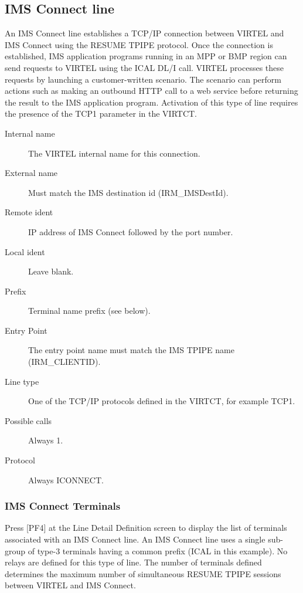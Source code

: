 \documentclass[letterpaper,10pt,english]{sphinxmanual}
\begin{document}
\subsection{IMS Connect line}
\label{\detokenize{connectivity_guide:ims-connect-line}}
An IMS Connect line establishes a TCP/IP connection between VIRTEL and IMS Connect using the RESUME TPIPE protocol. Once the connection is established, IMS application programs running in an MPP or BMP region can send requests to VIRTEL using the ICAL DL/I call. VIRTEL processes these requests by launching a customer-written scenario. The scenario can perform actions such as making an outbound HTTP call to a web service before returning the result to the IMS application program. Activation of this type of line requires the presence of the TCP1 parameter in the VIRTCT.


\begin{description}
\item[{Internal name}] \leavevmode
The VIRTEL internal name for this connection.

\item[{External name}] \leavevmode
Must match the IMS destination id (IRM\_IMSDestId).

\item[{Remote ident}] \leavevmode
IP address of IMS Connect followed by the port number.

\item[{Local ident}] \leavevmode
Leave blank.

\item[{Prefix}] \leavevmode
Terminal name prefix (see below).

\item[{Entry Point}] \leavevmode
The entry point name must match the IMS TPIPE name (IRM\_CLIENTID).

\item[{Line type}] \leavevmode
One of the TCP/IP protocols defined in the VIRTCT, for example TCP1.

\item[{Possible calls}] \leavevmode
Always 1.

\item[{Protocol}] \leavevmode
Always ICONNECT.

\end{description}


\subsubsection{IMS Connect Terminals}
\label{\detokenize{connectivity_guide:ims-connect-terminals}}
Press {[}PF4{]} at the Line Detail Definition screen to display the list of terminals associated with an IMS Connect line. An IMS Connect line uses a single sub-group of type-3 terminals having a common prefix (ICAL in this example). No relays are defined for this type of line. The number of terminals defined determines the maximum number of simultaneous RESUME TPIPE sessions between VIRTEL and IMS Connect.
\end{document}
